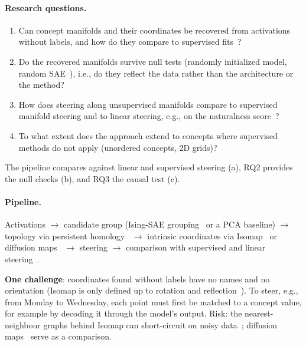 \documentclass[11pt,a4paper]{article}
\newcommand{\fromnotes}[1]{\textcolor{green!50!black}{#1}}
\newcommand{\fromclaude}[1]{\textcolor{orange!85!black}{#1}}
\newcommand{\fromnotes}[1]{#1}
\newcommand{\fromclaude}[1]{#1}
\begin{document}
\paragraph{Research questions.}
\begin{enumerate}[label=RQ\arabic*:]
  \item \fromclaude{Can concept manifolds and their coordinates be recovered from activations without labels, and how do they compare to supervised fits~\cite{wurgaft2026manifoldsteering}?}
  \item \fromclaude{Do the recovered manifolds survive null tests (randomly initialized model, random SAE~\cite{korznikov2026sanity}), i.e., do they reflect the data rather than the architecture or the method?}
  \item \fromclaude{How does steering along unsupervised manifolds compare to supervised manifold steering and to linear steering, e.g., on the naturalness score~\cite{wurgaft2026manifoldsteering}?}
  \item \fromclaude{To what extent does the approach extend to concepts where supervised methods do not apply (unordered concepts, 2D grids)?}
\end{enumerate}

\fromclaude{The pipeline compares against linear and supervised steering (a), RQ2 provides the null checks (b), and RQ3 the causal test (c).}


\paragraph{Pipeline.}
\fromnotes{Activations $\to$ candidate group (Ising-SAE grouping~\cite{bhalla2026saemanifolds} or a PCA baseline) $\to$ topology via persistent homology~\cite{tauzin2021giotto} $\to$ intrinsic coordinates via Isomap~\cite{tenenbaum2000isomap} or diffusion maps~\cite{coifman2006diffusion} $\to$ steering $\to$ comparison with supervised and linear steering~\cite{wurgaft2026manifoldsteering}.}

\fromclaude{\textbf{One challenge}: coordinates found without labels have no names and no orientation (Isomap is only defined up to rotation and reflection~\cite{tenenbaum2000isomap}). To steer, e.g., from Monday to Wednesday, each point must first be matched to a concept value, for example by decoding it through the model's output.}
\fromclaude{Risk: the nearest-neighbour graphs behind Isomap can short-circuit on noisy data~\cite{modell2025origins}; diffusion maps~\cite{coifman2006diffusion} serve as a comparison.}
\end{document}
